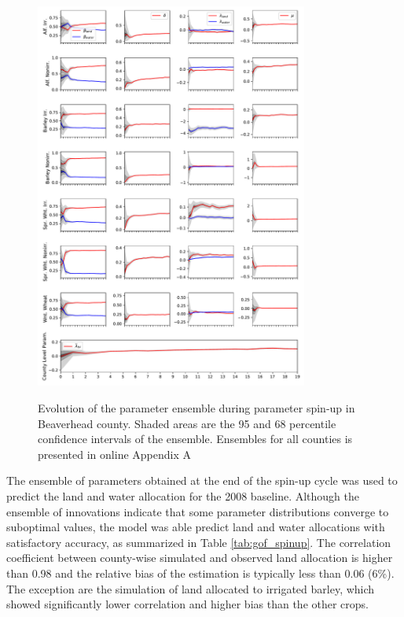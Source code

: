 \begin{figure}
\includegraphics[width=0.8\textwidth]{Figures/cal_spin_Beaverhead.pdf}
\label{fig:calibration_spinup}
\caption{Evolution of the parameter ensemble during parameter spin-up in Beaverhead county. Shaded areas are the 95 and 68 percentile confidence intervals of the ensemble. Ensembles for all counties is presented in online Appendix A}
\end{figure}




The ensemble of parameters obtained at the end of the spin-up cycle was used to predict the land and water allocation for the 2008 baseline. Although the ensemble of innovations indicate that some parameter distributions converge to suboptimal values, the model was able predict land and water allocations with satisfactory accuracy, as summarized in Table \ref{tab:gof_spinup}. The correlation coefficient between county-wise simulated and observed land allocation is higher than 0.98 and the relative bias of the estimation is typically less than 0.06 (6\%). The exception are the simulation of land allocated to irrigated barley, which showed significantly lower correlation and higher bias than the other crops.         

